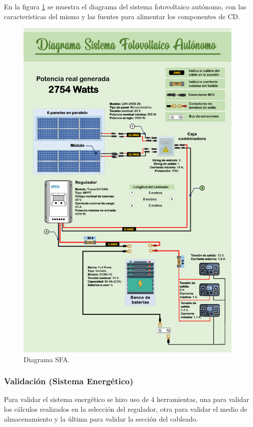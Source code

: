 En la figura \ref{fig:diagramaSFA} se muestra el diagrama del sistema fotovoltaico autónomo, con las características del mismo y las fuentes para alimentar los componentes de CD.

\newpage
\begin{figure}[H]
\centering
\includegraphics[width=13.5cm]{imagenes/dia_sininversor.pdf}
\caption{Diagrama SFA.}
\label{fig:diagramaSFA}
\end{figure}

\subsubsection{Validación (Sistema Energético)}
Para validar el sistema energético se hizo uso de 4 herramientas, una para validar los cálculos realizados en la selección del regulador, otra para validar el medio de almacenamiento y la última para validar la sección del cableado.

